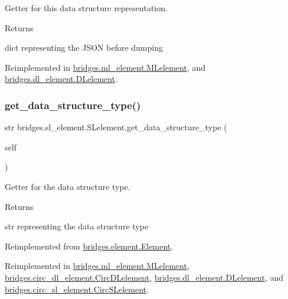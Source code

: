Getter for this data structure representation. 

\begin{DoxyReturn}{Returns}


dict representing the J\+S\+ON before dumping 
\end{DoxyReturn}


Reimplemented in \mbox{\hyperlink{classbridges_1_1ml__element_1_1_m_lelement_a962980c5497d59fb7cab10408c9c46f2}{bridges.\+ml\+\_\+element.\+M\+Lelement}}, and \mbox{\hyperlink{classbridges_1_1dl__element_1_1_d_lelement_aa64bd3f44ef45870456bf7bea80daadd}{bridges.\+dl\+\_\+element.\+D\+Lelement}}.

\mbox{\label{classbridges_1_1sl__element_1_1_s_lelement_ae6d1c0479d0ed763e1ea54f5d2f9a0eb}} 
\subsubsection{\texorpdfstring{get\_data\_structure\_type()}{get\_data\_structure\_type()}}
{\footnotesize\ttfamily  str bridges.\+sl\+\_\+element.\+S\+Lelement.\+get\+\_\+data\+\_\+structure\+\_\+type (\begin{DoxyParamCaption}\item[{}]{self }\end{DoxyParamCaption})}



Getter for the data structure type. 

\begin{DoxyReturn}{Returns}


str representing the data structure type 
\end{DoxyReturn}


Reimplemented from \mbox{\hyperlink{classbridges_1_1element_1_1_element_ada235252964d163ab1df8a9609b2af5b}{bridges.\+element.\+Element}}.



Reimplemented in \mbox{\hyperlink{classbridges_1_1ml__element_1_1_m_lelement_a756749f461e226ce7ae7e46f6efa48f8}{bridges.\+ml\+\_\+element.\+M\+Lelement}}, \mbox{\hyperlink{classbridges_1_1circ__dl__element_1_1_circ_d_lelement_a86837fc443104b20589874000821afbd}{bridges.\+circ\+\_\+dl\+\_\+element.\+Circ\+D\+Lelement}}, \mbox{\hyperlink{classbridges_1_1dl__element_1_1_d_lelement_a6ffddb5ac79a3945c1559dbc2236ab81}{bridges.\+dl\+\_\+element.\+D\+Lelement}}, and \mbox{\hyperlink{classbridges_1_1circ__sl__element_1_1_circ_s_lelement_a417f0fa7de0f4d1017ca7a27870c45d3}{bridges.\+circ\+\_\+sl\+\_\+element.\+Circ\+S\+Lelement}}.

